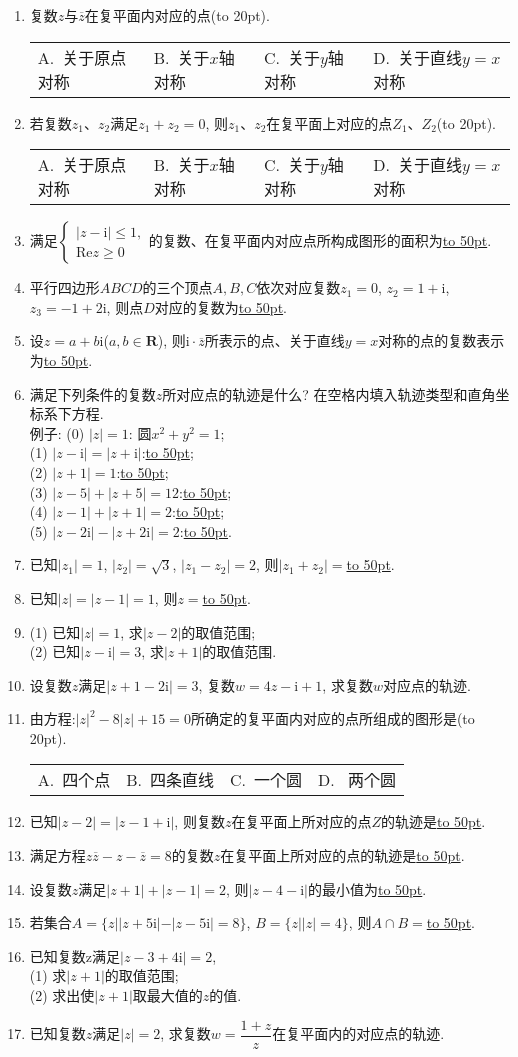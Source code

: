 \documentclass[10pt,a4paper]{article}
\newcommand{\blank}[1]{\underline{\hbox to #1pt{}}}
\newcommand{\bracket}[1]{(\hbox to #1pt{})}
\newcommand{\fourch}[4]{\par\begin{tabular}{p{.23\textwidth}p{.23\textwidth}p{.23\textwidth}p{.23\textwidth}}
A.~#1 &B.~#2& C.~#3& D.~#4
\end{tabular}}
\begin{document}
\begin{enumerate}[1.]
\item 复数$z$与$\overline z$在复平面内对应的点\bracket{20}.
\fourch{关于原点对称}{关于$x$轴对称}{关于$y$轴对称}{关于直线$y=x$对称}
\item 若复数$z_1$、$z_2$满足$z_1+z_2=0$, 则$z_1$、$z_2$在复平面上对应的点$Z_1$、$Z_2$\bracket{20}.
\fourch{关于原点对称}{关于$x$轴对称}{关于$y$轴对称}{关于直线$y=x$对称}
\item 满足$\begin{cases} |z-\mathrm{i}|\le 1, \\ \mathrm {Re}z\ge 0 \end{cases}$的复数、在复平面内对应点所构成图形的面积为\blank{50}.
\item 平行四边形$ABCD$的三个顶点$A,B,C$依次对应复数$z_1=0$, $z_2=1+\mathrm{i}$, $z_3=-1+2\mathrm{i}$, 则点$D$对应的复数为\blank{50}.
\item 设$z=a+b\mathrm{i}$($a,b\in\mathbf{R}$), 则$\mathrm{i}\cdot \overline{z}$所表示的点、关于直线$y=x$对称的点的复数表示为\blank{50}.
\item 满足下列条件的复数$z$所对应点的轨迹是什么? 在空格内填入轨迹类型和直角坐标系下方程.\\
例子: (0) $|z|=1$: 圆$x^2+y^2=1$;\\
(1) $|z-\mathrm{i}|=|z+\mathrm{i}|$:\blank{50};\\
(2) $|z+1|=1$:\blank{50};\\
(3) $|z-5|+|z+5|=12$:\blank{50};\\
(4) $|z-1|+|z+1|=2$:\blank{50};\\
(5) $|z-2\mathrm{i}|-|z+2\mathrm{i}|=2$:\blank{50}.
\item 已知$|z_1|=1$, $|z_2|=\sqrt{3}$, $|z_1-z_2|=2$, 则$|z_1+z_2|=$\blank{50}.
\item 已知$|z|=|z-1|=1$, 则$z=$\blank{50}.
\item (1) 已知$|z|=1$, 求$|z-2|$的取值范围;\\
(2) 已知$|z-\mathrm{i}|=3$, 求$|z+1|$的取值范围.
\item 设复数$z$满足$|z+1-2\mathrm{i}|=3$, 复数$w=4z-\mathrm{i}+1$, 求复数$w$对应点的轨迹.
\item 由方程:$|z|^2-8|z|+15=0$所确定的复平面内对应的点所组成的图形是\bracket{20}.
\fourch{四个点}{四条直线}{一个圆}{ 两个圆}
\item 已知$|z-2|=|z-1+\mathrm{i}|$, 则复数$z$在复平面上所对应的点$Z$的轨迹是\blank{50}.
\item 满足方程$z\overline{z}-z-\overline{z}=8$的复数$z$在复平面上所对应的点的轨迹是\blank{50}.
\item 设复数$z$满足$|z+1|+|z-1|=2$, 则$|z-4-\mathrm{i}|$的最小值为\blank{50}.
\item 若集合$A=\{z||z+5\mathrm{i}|-|z-5\mathrm{i}|=8\}$, $B=\{z||z|=4\}$, 则$A\cap B=$\blank{50}.
\item 已知复数z满足$|z-3+4\mathrm{i}|=2$,\\
(1) 求$|z+1|$的取值范围;\\
(2) 求出使$|z+1|$取最大值的$z$的值.
\item 已知复数$z$满足$|z|=2$, 求复数$w=\dfrac{1+z}z$在复平面内的对应点的轨迹.



\end{enumerate}
\end{document}
